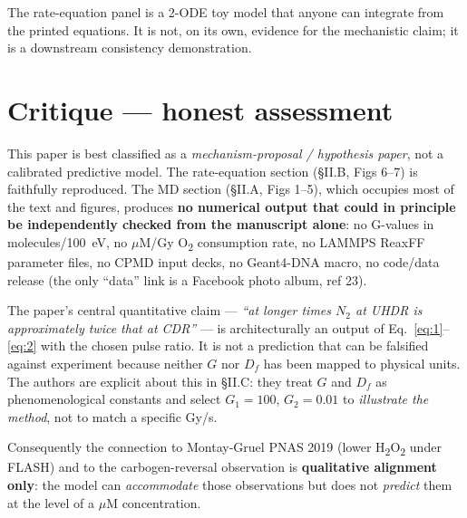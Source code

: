 \documentclass[11pt]{article}
\begin{document}
The rate-equation panel is a 2-ODE toy model that anyone can integrate from the printed equations. It is not, on its own, evidence for the mechanistic claim; it is a downstream consistency demonstration.

\section{Critique --- honest assessment}
This paper is best classified as a \emph{mechanism-proposal / hypothesis paper}, not a calibrated predictive model. The rate-equation section (\S II.B, Figs 6--7) is faithfully reproduced. The MD section (\S II.A, Figs 1--5), which occupies most of the text and figures, produces \textbf{no numerical output that could in principle be independently checked from the manuscript alone}: no G-values in molecules/100~eV, no $\mu$M/Gy O\textsubscript{2} consumption rate, no LAMMPS ReaxFF parameter files, no CPMD input decks, no Geant4-DNA macro, no code/data release (the only ``data'' link is a Facebook photo album, ref 23).

The paper's central quantitative claim --- \emph{``at longer times $N_2$ at UHDR is approximately twice that at CDR''} --- is architecturally an output of Eq.~\ref{eq:1}--\ref{eq:2} with the chosen pulse ratio. It is not a prediction that can be falsified against experiment because neither $G$ nor $D_f$ has been mapped to physical units. The authors are explicit about this in \S II.C: they treat $G$ and $D_f$ as phenomenological constants and select $G_1=100$, $G_2=0.01$ to \emph{illustrate the method}, not to match a specific Gy/s.

Consequently the connection to Montay-Gruel PNAS 2019 (lower H\textsubscript{2}O\textsubscript{2} under FLASH) and to the carbogen-reversal observation is \textbf{qualitative alignment only}: the model can \emph{accommodate} those observations but does not \emph{predict} them at the level of a $\mu$M concentration.
\end{document}
